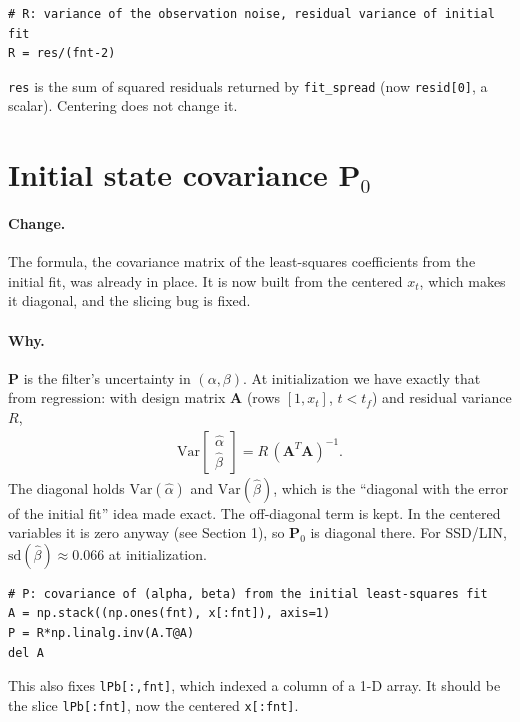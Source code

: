 \documentclass[11pt]{article}
\newcommand{\Var}{\text{Var}}
\newcommand{\bs}[1]{\boldsymbol{#1}}
\begin{document}
\begin{lstlisting}
# R: variance of the observation noise, residual variance of initial fit
R = res/(fnt-2)
\end{lstlisting}
\texttt{res} is the sum of squared residuals returned by \texttt{fit\_spread}
(now \texttt{resid[0]}, a scalar). Centering does not change it.

\section{Initial state covariance $\bs{P}_0$}

\paragraph{Change.} The formula, the covariance matrix of the least-squares
coefficients from the initial fit, was already in place. It is now built from
the centered $x_t$, which makes it diagonal, and the slicing bug is fixed.

\paragraph{Why.} $\bs{P}$ is the filter's uncertainty in $(\alpha, \beta)$. At
initialization we have exactly that from regression: with design matrix
$\bs{A}$ (rows $[1, x_t]$, $t < t_f$) and residual variance $R$,
\begin{gather*}
    \Var\begin{bmatrix}\hat\alpha\\ \hat\beta\end{bmatrix}
    = R\,(\bs{A}^T\bs{A})^{-1}.
\end{gather*}
The diagonal holds $\Var(\hat\alpha)$ and $\Var(\hat\beta)$, which is the
``diagonal with the error of the initial fit'' idea made exact. The
off-diagonal term is kept. In the centered variables it is zero anyway (see
Section 1), so $\bs{P}_0$ is diagonal there. For SSD/LIN,
$\text{sd}(\hat\beta) \approx 0.066$ at initialization.

\begin{lstlisting}
# P: covariance of (alpha, beta) from the initial least-squares fit
A = np.stack((np.ones(fnt), x[:fnt]), axis=1)
P = R*np.linalg.inv(A.T@A)
del A
\end{lstlisting}
This also fixes \texttt{lPb[:,fnt]}, which indexed a column of a 1-D array.
It should be the slice \texttt{lPb[:fnt]}, now the centered \texttt{x[:fnt]}.
\end{document}
